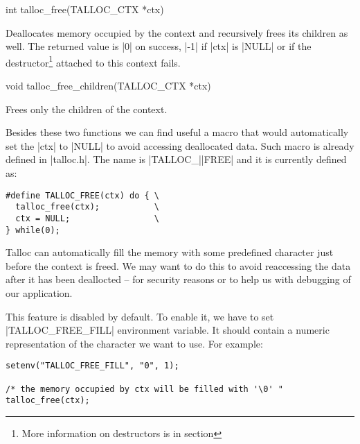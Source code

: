 \begin{funcproto}
int talloc_free(TALLOC_CTX *ctx)
\end{funcproto}
\begin{funcdesc}
  Deallocates memory occupied by the context and recursively frees its 
  children as well. The returned value is |0| on success, |-1| if |ctx| is
  |NULL| or if the destructor\footnote{More information on destructors is in
  section } attached to this context fails.
\end{funcdesc}
\begin{funcproto}
void talloc_free_children(TALLOC_CTX *ctx)
\end{funcproto}
\begin{funcdesc}
  Frees only the children of the context.
\end{funcdesc}
\funclistend
Besides these two functions we can find useful a macro that would automatically
set the |ctx| to |NULL| to avoid accessing deallocated data. Such macro is
already defined in |talloc.h|. The name is |TALLOC_||FREE| and it is
currently defined as:

\begin{lstlisting}[caption={TALLOC_FREE(ctx)},label=lst:TALLOC_FREE]
#define TALLOC_FREE(ctx) do { \
  talloc_free(ctx);           \
  ctx = NULL;                 \
} while(0);
\end{lstlisting}

\noindent
Talloc can automatically fill the memory with some predefined character just
before the context is freed. We may want to do this to avoid reaccessing the
data after it has been deallocted -- for security reasons or to help us with
debugging of our application.

This feature is disabled by default. To enable it, we have to set
|TALLOC_FREE_FILL| environment variable. It should contain a numeric
representation of the character we want to use. For example:

\begin{lstlisting}[caption={Automatically fill the memory}]
setenv("TALLOC_FREE_FILL", "0", 1);

/* the memory occupied by ctx will be filled with '\0' "
talloc_free(ctx);
\end{lstlisting}